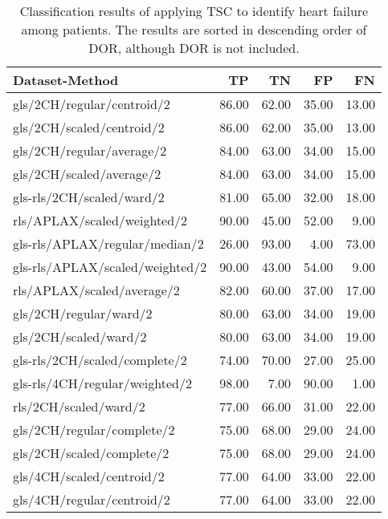 \begin{longtable}{lrrrr}
    \caption{Classification results of applying TSC to identify heart failure among patients.
             The results are sorted in descending order of DOR, although DOR is not included.}
    \label{tab:tsc_hf_raw_results}
    \hline
    Dataset-Method                            &    TP &    TN &    FP &    FN \\
    \hline 
    gls/2CH/regular/centroid/2                & 86.00 & 62.00 & 35.00 & 13.00 \\
    gls/2CH/scaled/centroid/2                 & 86.00 & 62.00 & 35.00 & 13.00 \\
    gls/2CH/regular/average/2                 & 84.00 & 63.00 & 34.00 & 15.00 \\
    gls/2CH/scaled/average/2                  & 84.00 & 63.00 & 34.00 & 15.00 \\
    gls-rls/2CH/scaled/ward/2                 & 81.00 & 65.00 & 32.00 & 18.00 \\
    rls/APLAX/scaled/weighted/2               & 90.00 & 45.00 & 52.00 &  9.00 \\
    gls-rls/APLAX/regular/median/2            & 26.00 & 93.00 &  4.00 & 73.00 \\
    gls-rls/APLAX/scaled/weighted/2           & 90.00 & 43.00 & 54.00 &  9.00 \\
    rls/APLAX/scaled/average/2                & 82.00 & 60.00 & 37.00 & 17.00 \\
    gls/2CH/regular/ward/2                    & 80.00 & 63.00 & 34.00 & 19.00 \\
    gls/2CH/scaled/ward/2                     & 80.00 & 63.00 & 34.00 & 19.00 \\
    gls-rls/2CH/scaled/complete/2             & 74.00 & 70.00 & 27.00 & 25.00 \\
    gls-rls/4CH/regular/weighted/2            & 98.00 &  7.00 & 90.00 &  1.00 \\
    rls/2CH/scaled/ward/2                     & 77.00 & 66.00 & 31.00 & 22.00 \\
    gls/2CH/regular/complete/2                & 75.00 & 68.00 & 29.00 & 24.00 \\
    gls/2CH/scaled/complete/2                 & 75.00 & 68.00 & 29.00 & 24.00 \\
    gls/4CH/scaled/centroid/2                 & 77.00 & 64.00 & 33.00 & 22.00 \\
    gls/4CH/regular/centroid/2                & 77.00 & 64.00 & 33.00 & 22.00 \\

\end{longtable}
